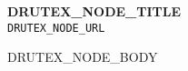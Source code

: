 \documentclass[a4paper, 10pt]{article}
\begin{document}
{\Large\bf DRUTEX_NODE_TITLE}\\
{\small\verb|DRUTEX_NODE_URL|}


\bigskip


DRUTEX_NODE_BODY
\end{document}
